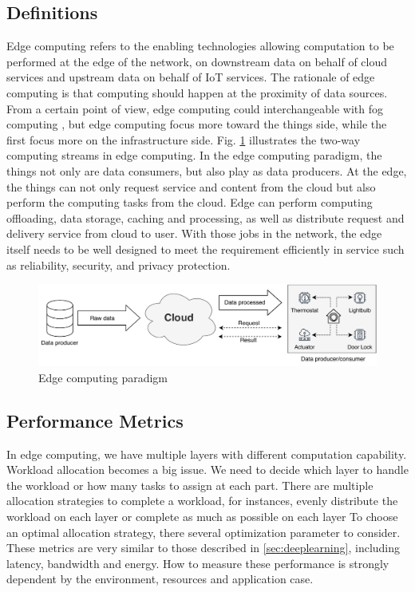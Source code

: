 \subsection{Definitions}
Edge computing refers to the enabling technologies allowing computation to be performed at the edge of the network, on downstream data on behalf of cloud services and upstream data on behalf of IoT services. The rationale of edge computing is that computing should happen at the proximity of data sources. From a certain point of view, edge computing could interchangeable with fog computing \cite{openfog}, but edge computing focus more toward the things side, while the first focus more on the infrastructure side. Fig. \ref{fig:edgearch} illustrates the two-way computing streams in edge computing. In the edge computing paradigm, the things not only are data consumers, but also play as data producers. At the edge, the things can not only request service and content from the cloud but also perform the computing tasks from the cloud. Edge can perform computing offloading, data storage, caching and processing, as well as distribute request and delivery service from cloud to user. With those jobs in the network, the edge itself needs to be well designed to meet the requirement efficiently in service such as reliability, security, and privacy protection.

\begin{figure}[tbp]
	\centering
	\includegraphics[width=0.9\linewidth]{images/edgearch}
	\caption{Edge computing paradigm}
	\label{fig:edgearch}
\end{figure}


\subsection{Performance Metrics}
In edge computing, we have multiple layers with different computation capability. Workload allocation becomes a big
issue. We need to decide which layer to handle the workload or how many tasks to assign at each part. There are multiple allocation strategies to complete a workload, for instances,
evenly distribute the workload on each layer or complete as much as possible on each layer To choose an optimal allocation strategy, there several optimization parameter to consider. These metrics are very similar to those described in \ref{sec:deeplearning}, including latency, bandwidth and energy. How to measure these performance is strongly dependent by the environment, resources and application case.


